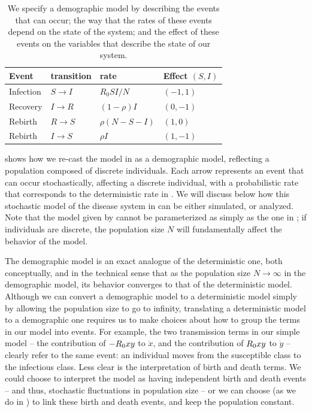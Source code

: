 \documentclass{amsproc}
\theoremstyle{definition}
\theoremstyle{remark}
\numberwithin{equation}{section}
\begin{document}
\begin{table}
\begin{center}\begin{tabular}{llll}
   {\bf Event} & {\bf transition} &{\bf rate} &{\bf Effect $(S,I)$}\\
   \hline
   Infection &$S \to I$  &$R_0 SI/N$ & $(-1,1)$\\
   Recovery & $I \to R$ & $(1-\rho)I$ & $(0,-1)$\\
   Rebirth &  $R \to S$ & $\rho (N-S-I)$ & $(1,0)$\\
   Rebirth & $I \to S$ & $\rho I$ & $(1,-1)$
\end{tabular}\end{center}
\caption[Rates table]{
%
	We specify a demographic model by describing the events that can occur; the way that the rates of these events depend on the state of the system; and the effect of these events on the variables that describe the state of our system.
%
}
\end{table}

 shows how we re-cast the model in  as a demographic model, reflecting a population composed of discrete individuals.
Each arrow represents an event that can occur stochastically, affecting a discrete individual, with a probabilistic rate that corresponds to the deterministic rate in .  
We will discuss below how this stochastic model of the disease system in  can be either simulated, or analyzed.  Note that the model given by  cannot be parameterized as simply as the one in ; if individuals are discrete, the population size $N$ will fundamentally affect the behavior of the model.

The demographic model is an exact analogue of the deterministic one, both conceptually, and in the technical sense that as the population size $N\to\infty$ in the demographic model, its behavior converges to that of the deterministic model.  
Although we can convert a demographic model to a deterministic model simply by allowing the population size to go to infinity, translating a deterministic model to a demographic one requires us to make choices about how to group the terms in our model into events.  For example, the two transmission terms in our simple model -- the contribution of $-R_0 xy$ to $\dot x$, and the contribution of $R_0 xy$ to $\dot y$ -- clearly refer to the same event: an individual moves from the susceptible class to the infectious class.  Less clear is the interpretation of birth and death terms.  We could choose to interpret the model  as having independent birth and death events -- and thus, stochastic fluctuations in population size -- or we can choose (as we do in ) to link these birth and death events, and keep the population constant.
\end{document}
